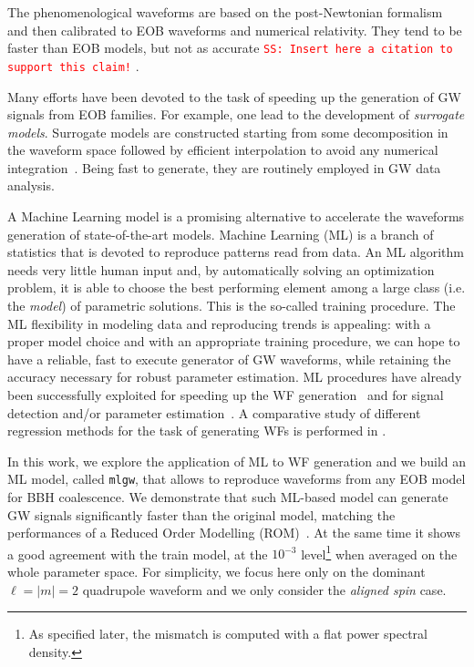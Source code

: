 \documentclass[twocolumn,showpacs,preprintnumbers,nofootinbib,prd,
superscriptaddress,10pt]{revtex4-1}
\newcommand{\sschmidt}[1]{{\textcolor{red}{\texttt{SS: #1}} }}
\begin{document}
The phenomenological waveforms are based on the post-Newtonian formalism and then calibrated 
to  EOB waveforms and numerical relativity. They tend to be faster than EOB models, but not as accurate \sschmidt{Insert here a citation to support this claim!}.

Many efforts have been devoted to the task of speeding up the generation of GW signals from 
EOB families. For example, one lead to the development of \textit{surrogate models}. Surrogate 
models are constructed starting from some decomposition in the waveform space followed by efficient 
interpolation to avoid any  numerical integration~\cite{Purrer:2015tud,Bohe:2016gbl,Purrer:2017str,Lackey:2018zvw,Cotesta:2020qhw}. 
Being fast to generate, they are routinely employed in GW data analysis. 

A Machine Learning model is a promising alternative to accelerate the
waveforms generation of state-of-the-art models.
Machine Learning (ML) is a branch of statistics that is devoted to reproduce patterns read from data. 
An ML algorithm needs very little human input and, by automatically solving an optimization problem, 
it is able to choose the best performing element among a large class (i.e. the \textit{model}) of parametric solutions. 
This is the so-called training procedure. 
The ML flexibility in modeling data and reproducing trends is appealing: with a proper model choice 
and with an appropriate training procedure, we can hope to have a reliable, fast to execute generator 
of GW waveforms, while retaining the accuracy necessary for robust parameter estimation.
ML procedures have already been successfully exploited for speeding up the WF generation~\cite{Khan:2020fso, Chua_2019}
and for signal detection and/or parameter estimation~\cite{Gabbard:2017lja,George:2017pmj,George:2017vlv,Rebei:2018lzh,Chatterjee:2019gqr,Wong:2020wvd, Khan:2020foe}. A comparative study of different regression methods for the task of generating WFs is performed in \cite{Setyawati:2019xzw}.

In this work, we explore the application of ML to WF generation and we build an ML model, called \texttt{mlgw}, that allows to reproduce 
waveforms from any EOB model for BBH coalescence. We demonstrate that such ML-based model can generate 
GW signals significantly faster than the original model, 
matching the performances of a Reduced Order Modelling 
(ROM)~\cite{Purrer:2015tud,Bohe:2016gbl,Purrer:2017str, Field:2013cfa}.  
At the same time it shows a good agreement with the train model, at the $10^{-3}$ level\footnote{
As specified later, the mismatch is computed with a flat power spectral density.
} when averaged on the whole parameter space. For simplicity, we focus here only on the 
dominant $\ell=|m|=2$ quadrupole waveform and we only consider the \textit{aligned spin} case.
\end{document}
